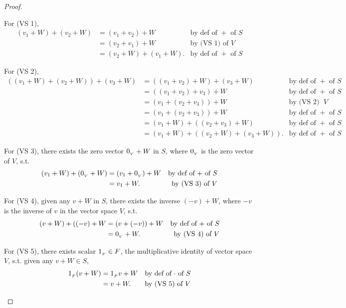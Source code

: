\begin{proof}
\begin{enumerate}
For (VS 1),
\begin{align*}
    (v_1 + W) + (v_2 + W) & = (v_1 + v_2) + W & \text{by def of \(+\) of \(S\)} \\
                          & = (v_2 + v_1) + W & \text{by (VS 1) of \(V\)} \\
                          & = (v_2 + W) + (v_1 + W). & \text{by def of \(+\) of \(S\)}
\end{align*}

For (VS 2),
\begin{align*}
    ((v_1 + W) + (v_2 + W)) + (v_3 + W) & = ((v_1 + v_2) + W) + (v_3 + W) & \text{by def of \(+\) of \(S\)} \\
                          & = ((v_1 + v_2) + v_3) + W & \text{by def of \(+\) of \(S\)} \\
                          & = (v_1 + (v_2 + v_3)) + W & \text{by (VS 2) of \(V\)} \\
                          & = (v_1 + (v_2 + v_3)) + W & \text{by def of \(+\) of \(S\)} \\
                          & = (v_1 + W) + ((v_2 + v_3) + W) & \text{by def of \(+\) of \(S\)} \\
                          & = (v_1 + W) + ((v_2 + W) + (v_3 + W)). & \text{by def of \(+\) of \(S\)}
\end{align*}

For (VS 3), there exists the zero vector \(0_{_V} + W\) in \(S\), where \(0_{_V}\) is the zero vector of \(V\), s.t.
\begin{align*}
    (v_1 + W) + (0_{_V} + W) & = (v_1 + 0_{_V}) + W & \text{by def of \(+\) of \(S\)} \\
                          & = v_1 + W. & \text{by (VS 3) of \(V\)}
\end{align*}

For (VS 4), given any \(v + W\) in \(S\), there exists the inverse \((-v) + W\), where \(-v\) is the inverse of \(v\) in the vector space \(V\), s.t.
\begin{align*}
    (v + W) + ((-v) + W & = (v + (-v)) + W & \text{by def of \(+\) of \(S\)} \\
                        & = 0_{_V} + W. & \text{by (VS 4) of \(V\)}
\end{align*}

For (VS 5), there exists scalar \(1_{_F} \in F\), the multiplicative identity of vector space \(V\), s.t. given any \(v + W \in S\),
\begin{align*}
    1_{_F}(v + W)& = 1_{_F} v + W & \text{by def of \(\cdot\) of \(S\)} \\
                          & = v + W. & \text{by (VS 5) of \(V\)}
\end{align*}


\end{enumerate}
\end{proof}
